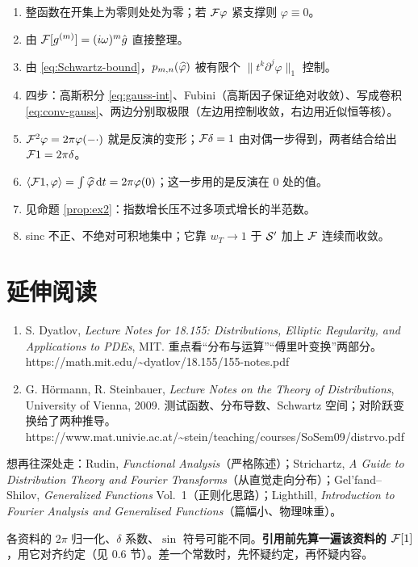 \begin{enumerate}[leftmargin=1.8em,itemsep=0.3em]
\item 整函数在开集上为零则处处为零；若 $\mathcal{F}\varphi$ 紧支撑则 $\varphi\equiv0$。
\item 由 $\mathcal{F}[g^{(m)}]=(i\omega)^{m}\hat g$ 直接整理。
\item 由 \eqref{eq:Schwartz-bound}，$p_{m,n}(\widehat{\varphi})$ 被有限个 $\|t^{k}\partial^{j}\varphi\|_1$ 控制。
\item 四步：高斯积分 \eqref{eq:gauss-int}、Fubini（高斯因子保证绝对收敛）、写成卷积 \eqref{eq:conv-gauss}、两边分别取极限（左边用控制收敛，右边用近似恒等核）。
\item $\mathcal{F}^{2}\varphi=2\pi\varphi(-\cdot)$ 就是反演的变形；$\mathcal{F}\delta=1$ 由对偶一步得到，两者结合给出 $\mathcal{F}1=2\pi\delta$。
\item $\langle \mathcal{F}1,\varphi\rangle=\int\widehat{\varphi}\mathop{}\!\mathrm{d} t=2\pi\varphi(0)$；这一步用的是反演在 $0$ 处的值。
\item 见命题 \ref{prop:ex2}：指数增长压不过多项式增长的半范数。
\item sinc 不正、不绝对可积地集中；它靠 $w_T\to1$ 于 $\mathcal{S}'$ 加上 $\mathcal{F}$ 连续而收敛。
\end{enumerate}

\section{延伸阅读}

\begin{ideabox}[与本书框架最接近的两份讲义]
\begin{enumerate}[leftmargin=1.8em,itemsep=0.3em]
\item S. Dyatlov, \emph{Lecture Notes for 18.155: Distributions, Elliptic Regularity, and Applications to PDEs}, MIT. 重点看“分布与运算”“傅里叶变换”两部分。\\
{\small\ttfamily https://math.mit.edu/\~{}dyatlov/18.155/155-notes.pdf}
\item G. Hörmann, R. Steinbauer, \emph{Lecture Notes on the Theory of Distributions}, University of Vienna, 2009. 测试函数、分布导数、Schwartz 空间；对阶跃变换给了两种推导。\\
{\small\ttfamily https://www.mat.univie.ac.at/\~{}stein/teaching/courses/SoSem09/distrvo.pdf}
\end{enumerate}
\end{ideabox}

\noindent 想再往深处走：Rudin, \emph{Functional Analysis}（严格陈述）；Strichartz, \emph{A Guide to Distribution Theory and Fourier Transforms}（从直觉走向分布）；Gel'fand--Shilov, \emph{Generalized Functions} Vol.~1（正则化思路）；Lighthill, \emph{Introduction to Fourier Analysis and Generalised Functions}（篇幅小、物理味重）。

\begin{warnbox}[引用前必做的一件事]
各资料的 $2\pi$ 归一化、$\delta$ 系数、$\sin$ 符号可能不同。\textbf{引用前先算一遍该资料的 $\mathcal{F}[1]$}，用它对齐约定（见 0.6 节）。差一个常数时，先怀疑约定，再怀疑内容。
\end{warnbox}
